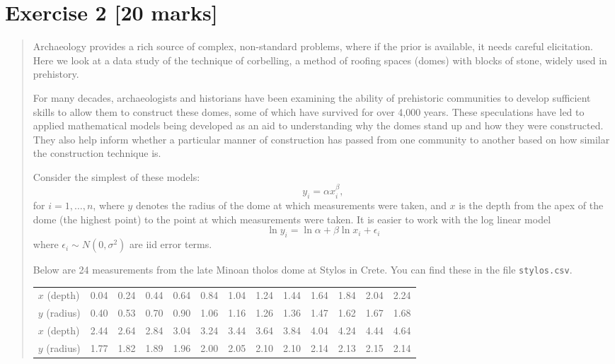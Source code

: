 \documentclass{article}
\newenvironment{question}{\begin{quote}\small}{\end{quote}}
\begin{document}
\section*{Exercise 2 [20 marks]}

\begin{question}
Archaeology provides a rich source of complex, non-standard problems, where if the prior is available, it needs careful elicitation. Here we look at a data study of the technique of corbelling, a method of roofing spaces (domes) with blocks of stone, widely used in prehistory.


For many decades, archaeologists and historians have been examining the ability of prehistoric communities to develop sufficient skills to allow them to construct these domes, some of which have survived for over 4,000 years. These speculations have led to applied mathematical models being developed as an aid to understanding why the domes stand up and how they were constructed. They also help inform whether a particular manner of construction has passed from one community to another based on how similar the construction technique is.

Consider the simplest of these models:
\[
    y_i = \alpha x_i^\beta,
\]
for $i = 1, \dots, n$, where $y$ denotes the radius of the dome at which measurements were taken, and $x$ is the depth from the apex of the dome (the highest point) to the point at which measurements were taken. It is easier to work with the log linear model
\[
    \ln y_i = \ln\alpha + \beta \ln x_i + \epsilon_i
\]
where $\epsilon_i \sim N(0, \sigma^2)$ are iid error terms.

Below are 24 measurements from the late Minoan tholos dome at Stylos in Crete. You can find these in the file \texttt{stylos.csv}.

\begin{center}
\footnotesize
\setlength{\tabcolsep}{3pt}
\begin{tabular}{l|cccccccccccc}
    $x$ (depth)  & 0.04 & 0.24 & 0.44 & 0.64 & 0.84 & 1.04 & 1.24 & 1.44 & 1.64 & 1.84 & 2.04 & 2.24 \\
    $y$ (radius) & 0.40 & 0.53 & 0.70 & 0.90 & 1.06 & 1.16 & 1.26 & 1.36 & 1.47 & 1.62 & 1.67 & 1.68 \\
    \hline
    $x$ (depth)  & 2.44 & 2.64 & 2.84 & 3.04 & 3.24 & 3.44 & 3.64 & 3.84 & 4.04 & 4.24 & 4.44 & 4.64 \\
    $y$ (radius) & 1.77 & 1.82 & 1.89 & 1.96 & 2.00 & 2.05 & 2.10 & 2.10 & 2.14 & 2.13 & 2.15 & 2.14
\end{tabular}


\end{center}
\end{question}
\end{document}
